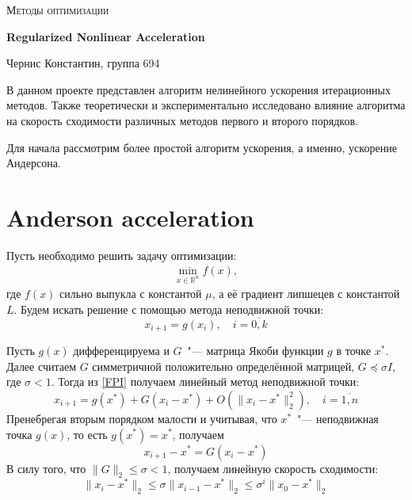 \documentclass[12pt]{article}
\date{}
\author{Константин Чернис, группа 694}
\theoremstyle{definition}
\numberwithin{Def}{section}
\numberwithin{Th}{section}
\numberwithin{Prop}{section}
\numberwithin{St}{section}
\numberwithin{Cor}{section}
\begin{document}
\begin{titlepage}
	\centering
	{\scshape\Large Методы оптимизации\par}
	\vspace{1.5cm}
	{\huge\bfseries Regularized Nonlinear Acceleration\par}
	\vspace{2cm}
	{\Large Чернис Константин, группа 694\par}
	\newpage
\end{titlepage}
\tableofcontents
\newpage

В данном проекте представлен алгоритм нелинейного ускорения итерационных методов.
Также теоретически и экспериментально исследовано влияние алгоритма на скорость
сходимости различных методов первого и второго порядков.

Для начала рассмотрим более простой алгоритм ускорения, а именно, ускорение 
Андерсона.

\section{Anderson acceleration}

Пусть необходимо решить задачу оптимизации:
\begin{align*}
	\min_{x\in \mathbb{R}^n} f(x),
\end{align*}
где $f(x)$ сильно выпукла с константой $\mu$, а её градиент липшецев с константой
$L$. Будем искать решение с помощью метода неподвижной точки:
\begin{equation}\label{FPI}
x_{i+1}=g(x_i),\quad i=\overline{0,k}
\end{equation}

Пусть $g(x)$ дифференцируема и $G$~"--- матрица Якоби функции $g$ в точке $x^*$.
Далее считаем $G$ симметричной положительно определённой матрицей,
$G\preceq\sigma I$, где $\sigma<1$. Тогда из \eqref{FPI} получаем
линейный метод неподвижной точки:
\begin{equation}\label{LFPI}
x_{i+1}=g(x^*)+G(x_i-x^*)+O\left(\|x_i-x^*\|^2_2\right),\quad i=\overline{1,n}
\end{equation}
Пренебрегая вторым порядком малости и учитывая, что $x^*$~"--- неподвижная точка
$g(x)$, то есть $g(x^*)=x^*$, получаем
$$
x_{i+1}-x^*=G(x_i-x^*)$$
В силу того, что $\|G\|_2\leqslant\sigma< 1$, получаем линейную скорость
сходимости:
\newcommand{\euc}[1]{\|#1\|_2}
$$
\euc{x_i-x^*}\leqslant \sigma\euc{x_{i-1}-x^*}\leqslant \sigma^i\euc{x_0-x^*}
$$
\end{document}

